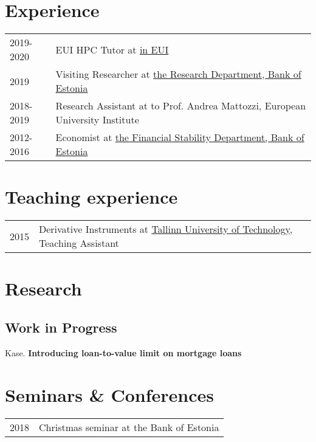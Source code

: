 \documentclass[a4, 11pt]{article}
\begin{document}
    \section*{Experience}
  \begin{table}[H]
      \begin{tabular}{p{2cm}p{14cm}}
          2019-2020 & EUI HPC Tutor at \href{https://www.eui.eu/ServicesAndAdmin/ComputingService/HeavyComputationalTasks}{in EUI} \\
          2019 & Visiting Researcher at \href{https://www.eestipank.ee/en}{the Research Department, Bank of Estonia} \\
          2018-2019 & Research Assistant at {to Prof. Andrea Mattozzi, European University Institute} \\
          2012-2016 & Economist at \href{https://www.eestipank.ee/en}{the Financial Stability Department, Bank of Estonia} \\
      \end{tabular}
    \end{table}


    \section*{Teaching experience}
  \begin{table}[H]
      \begin{tabular}{p{2cm}p{14cm}}
          2015 & {Derivative Instruments} at \href{https://www.ttu.ee/en}{Tallinn University of Technology}, Teaching Assistant\\
      \end{tabular}
    \end{table}


    \section*{Research}\subsection*{Work in Progress}
      Kase. \textbf{Introducing loan-to-value limit on mortgage loans}\\


    \section*{Seminars \& Conferences}
\begin{table}[H]
    \begin{tabular}{p{2cm}p{14cm}}
        2018 & {Christmas seminar} at {the Bank of Estonia}\\
    \end{tabular}
  \end{table}
\end{document}
